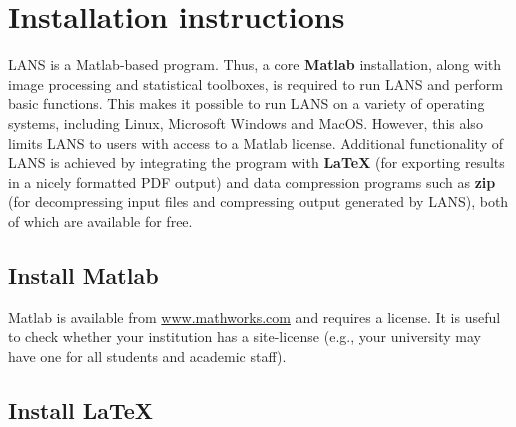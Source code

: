 \section{Installation instructions}

LANS is a Matlab-based program. Thus, a core \textbf{Matlab} installation, along with image processing and statistical toolboxes, is required to run LANS and perform basic functions. This makes it possible to run LANS on a variety of operating systems, including Linux, Microsoft Windows and MacOS. However, this also limits LANS to users with access to a Matlab license. Additional functionality of LANS is achieved by integrating the program with \textbf{\LaTeX} (for exporting results in a nicely formatted PDF output) and data compression programs such as \textbf{zip} (for decompressing input files and compressing output generated by LANS), both of which are available for free.


\subsection{Install Matlab}
\setcounter{step}{0}

\goldbox{}
Matlab is available from \url{www.mathworks.com} and requires a license. It is useful to check whether your institution has a site-license (e.g., your university may have one for all students and academic staff). 
\tcbe





\subsection{Install \LaTeX}
\setcounter{step}{0}

